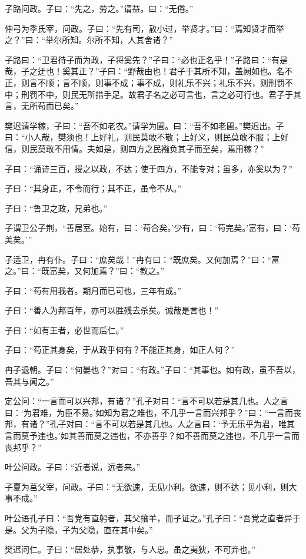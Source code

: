 \documentclass[twoside,openany]{book}
\begin{document}
子路问政。子曰：“先之，劳之。”请益。曰：“无倦。”

仲弓为季氏宰，问政。子曰：“先有司，赦小过，举贤才。”曰：“焉知贤才而举之？”曰：“举尔所知。尔所不知，人其舍诸？”

子路曰：“卫君待子而为政，子将奚先？”子曰：“必也正名乎！”子路曰：“有是哉，子之迂也！奚其正？”子曰：“野哉由也！君子于其所不知，盖阙如也。名不正，则言不顺；言不顺，则事不成；事不成，则礼乐不兴；礼乐不兴，则刑罚不中；刑罚不中，则民无所措手足。故君子名之必可言也，言之必可行也。君子于其言，无所苟而已矣。”

樊迟请学稼，子曰：“吾不如老农。”请学为圃。曰：“吾不如老圃。”樊迟出。子曰：“小人哉，樊须也！上好礼，则民莫敢不敬；上好义，则民莫敢不服；上好信，则民莫敢不用情。夫如是，则四方之民襁负其子而至矣，焉用稼？”

子曰：“诵诗三百，授之以政，不达；使于四方，不能专对；虽多，亦奚以为？”

子曰：“其身正，不令而行；其不正，虽令不从。”

子曰：“鲁卫之政，兄弟也。”

子谓卫公子荆，“善居室。始有，曰：‘苟合矣。’少有，曰：‘苟完矣。’富有，曰：‘苟美矣。’”

子适卫，冉有仆。子曰：“庶矣哉！”冉有曰：“既庶矣。又何加焉？”曰：“富之。”曰：“既富矣，又何加焉？”曰：“教之。”

子曰：“苟有用我者。期月而已可也，三年有成。”

子曰：“善人为邦百年，亦可以胜残去杀矣。诚哉是言也！”

子曰：“如有王者，必世而后仁。”

子曰：“苟正其身矣，于从政乎何有？不能正其身，如正人何？”

冉子退朝。子曰：“何晏也？”对曰：“有政。”子曰：“其事也。如有政，虽不吾以，吾其与闻之。”

定公问：“一言而可以兴邦，有诸？”孔子对曰：“言不可以若是其几也。人之言曰：‘为君难，为臣不易。’如知为君之难也，不几乎一言而兴邦乎？”曰：“一言而丧邦，有诸？”孔子对曰：“言不可以若是其几也。人之言曰：‘予无乐乎为君，唯其言而莫予违也。’如其善而莫之违也，不亦善乎？如不善而莫之违也，不几乎一言而丧邦乎？”

叶公问政。子曰：“近者说，远者来。”

子夏为莒父宰，问政。子曰：“无欲速，无见小利。欲速，则不达；见小利，则大事不成。”

叶公语孔子曰：“吾党有直躬者，其父攘羊，而子证之。”孔子曰：“吾党之直者异于是。父为子隐，子为父隐，直在其中矣。”

樊迟问仁。子曰：“居处恭，执事敬，与人忠。虽之夷狄，不可弃也。”
\end{document}
